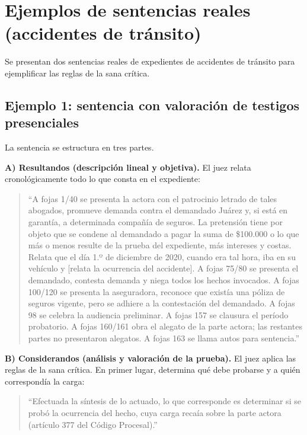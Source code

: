 \documentclass[12pt,oneside]{book}
\begin{document}
\section{Ejemplos de sentencias reales (accidentes de tránsito)}

Se presentan dos sentencias reales de expedientes de accidentes de tránsito para ejemplificar las reglas de la sana crítica.

\subsection{Ejemplo 1: sentencia con valoración de testigos presenciales}

La sentencia se estructura en tres partes.

\textbf{A) Resultandos (descripción lineal y objetiva).} El juez relata cronológicamente todo lo que consta en el expediente:

\begin{quote}
``A fojas 1/40 se presenta la actora con el patrocinio letrado de tales abogados, promueve demanda contra el demandado Juárez y, si está en garantía, a determinada compañía de seguros. La pretensión tiene por objeto que se condene al demandado a pagar la suma de \$100.000 o lo que más o menos resulte de la prueba del expediente, más intereses y costas. Relata que el día 1.º de diciembre de 2020, cuando era tal hora, iba en su vehículo y [relata la ocurrencia del accidente]. A fojas 75/80 se presenta el demandado, contesta demanda y niega todos los hechos invocados. A fojas 100/120 se presenta la aseguradora, reconoce que existía una póliza de seguros vigente, pero se adhiere a la contestación del demandado. A fojas 98 se celebra la audiencia preliminar. A fojas 157 se clausura el período probatorio. A fojas 160/161 obra el alegato de la parte actora; las restantes partes no presentaron alegatos. A fojas 163 se llama autos para sentencia.''
\end{quote}

\textbf{B) Considerandos (análisis y valoración de la prueba).} El juez aplica las reglas de la sana crítica. En primer lugar, determina qué debe probarse y a quién correspondía la carga:

\begin{quote}
``Efectuada la síntesis de lo actuado, lo que corresponde es determinar si se probó la ocurrencia del hecho, cuya carga recaía sobre la parte actora (artículo 377 del Código Procesal).''
\end{quote}
\end{document}
